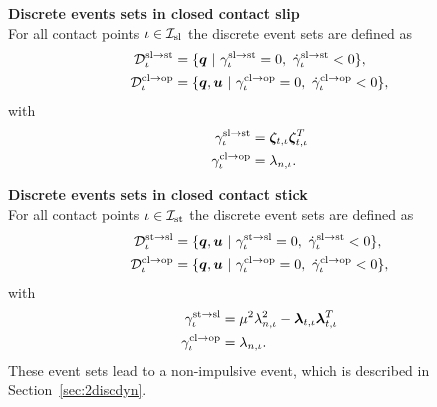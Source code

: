 \documentclass[../DC2017114Bouma.tex]{subfiles}
\begin{document}
\textbf{Discrete events sets in closed contact slip}\\
For all contact points $\iota\in\mathcal{I}_{\text{sl}}$ the discrete event sets are defined as
\begin{align}
\mathcal{D}^{\text{sl}\rightarrow\text{st}}_{\iota} &= \{ \qb\ |\ \gamma^{\text{sl}\rightarrow\text{st}}_{\iota} = 0,\ \dot{\gamma}^{\text{sl}\rightarrow\text{st}}_{\iota} < 0\},\label{eq:2Dslst}\\
\mathcal{D}^{\text{cl}\rightarrow\text{op}}_{\iota} &= \{ \qb,\ub\ |\ \gamma^{\text{cl}\rightarrow\text{op}}_{\iota} = 0,\ \dot{\gamma}^{\text{cl}\rightarrow\text{op}}_{\iota} < 0\},\label{eq:2Dslop}
\end{align}
with 
\begin{align}
\gamma^{\text{sl}\rightarrow\text{st}}_{\iota} &= \boldsymbol{\zeta}_{t,\iota}\boldsymbol{\zeta}_{t,\iota}^T\\
\gamma^{\text{cl}\rightarrow\text{op}}_{\iota} &= \lambda_{n,\iota}.
\end{align}

\textbf{Discrete events sets in closed contact stick}\\
For all contact points $\iota\in\mathcal{I}_{\text{st}}$ the discrete event sets are defined as
\begin{align}
\mathcal{D}^{\text{st}\rightarrow\text{sl}}_{\iota} &= \{ \qb,\ub\ |\ \gamma^{\text{st}\rightarrow\text{sl}}_{\iota} = 0,\ \dot{\gamma}^{\text{sl}\rightarrow\text{st}}_{\iota} < 0\},\label{eq:2Dstsl}\\
\mathcal{D}^{\text{cl}\rightarrow\text{op}}_{\iota} &= \{ \qb,\ub\ |\ \gamma^{\text{cl}\rightarrow\text{op}}_{\iota} = 0,\ \dot{\gamma}^{\text{cl}\rightarrow\text{op}}_{\iota} < 0\},\label{eq:2Dstop}
\end{align}
with 
\begin{align}
\gamma^{\text{st}\rightarrow\text{sl}}_{\iota} &= \mu^2\lambda_{n,\iota}^2-\boldsymbol{\lambda}_{t,\iota}\boldsymbol{\lambda}_{t,\iota}^T\\
\gamma^{\text{cl}\rightarrow\text{op}}_{\iota} &= \lambda_{n,\iota}.
\end{align}
These event sets lead to a non-impulsive event, which is described in Section~\ref{sec:2discdyn}.
\end{document}
